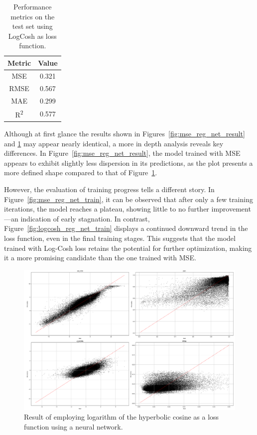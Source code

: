 \begin{table}[H]
    \centering
    \begin{tabular}{|c|c|}
    \hline
    \textbf{Metric} & \textbf{Value} \\
    \hline
    MSE & 0.321 \\
    RMSE & 0.567 \\
    MAE & 0.299 \\
    R\textsuperscript{2} & 0.577 \\
    \hline
    \end{tabular}
    \caption{Performance metrics on the test set using LogCosh as loss function.}
    \label{tab:test_metrics_logcosh}
\end{table}

Although at first glance the results shown in Figures~\ref{fig:mse_reg_net_result} and \ref{fig:logcosh_reg_net_result} may appear nearly identical, a more in depth analysis reveals key differences. In Figure~\ref{fig:mse_reg_net_result}, the model trained with MSE appears to exhibit slightly less dispersion in its predictions, as the plot presents a more defined shape compared to that of Figure~\ref{fig:logcosh_reg_net_result}.

However, the evaluation of training progress tells a different story. In Figure~\ref{fig:mse_reg_net_train}, it can be observed that after only a few training iterations, the model reaches a plateau, showing little to no further improvement—an indication of early stagnation. In contrast, Figure~\ref{fig:logcosh_reg_net_train} displays a continued downward trend in the loss function, even in the final training stages. This suggests that the model trained with Log-Cosh loss retains the potential for further optimization, making it a more promising candidate than the one trained with MSE.


\begin{figure}[H]
    \centering
    \includegraphics[width=1\textwidth]{figures/neural_net_regression_research/output_neural_net_logcosh.png}
    \caption{Result of employing logarithm of the hyperbolic cosine as a loss function using a neural network.}
    \label{fig:logcosh_reg_net_result}
\end{figure}

